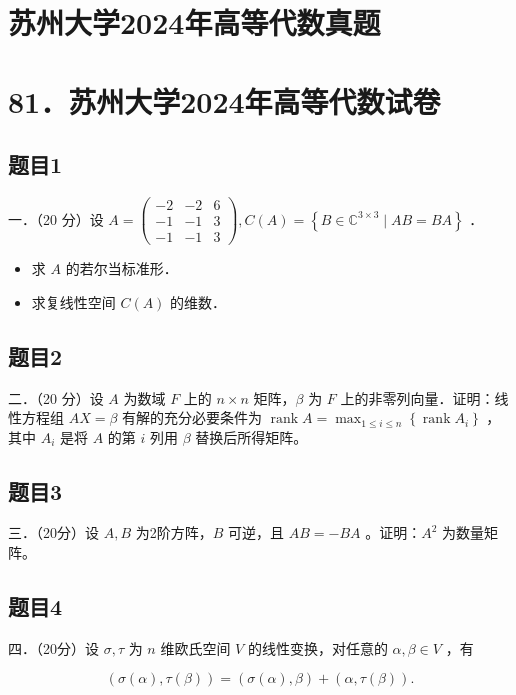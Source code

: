 \documentclass{article}
\begin{document}
\section*{苏州大学2024年高等代数真题}
\section*{81．苏州大学2024年高等代数试卷}

\subsection{题目1}
一．（20 分）设 \(A=\left(\begin{array}{lll}-2 & -2 & 6 \\ -1 & -1 & 3 \\ -1 & -1 & 3\end{array}\right), C(A)=\left\{B \in \mathbb{C}^{3 \times 3} \mid A B=B A\right\}\) ．

\begin{itemize}
  \item[（1）] 求 \(A\) 的若尔当标准形．
  \item[（2）] 求复线性空间 \(C(A)\) 的维数．
\end{itemize}

\subsection{题目2}
二．（20 分）设 \(A\) 为数域 \(F\) 上的 \(n \times n\) 矩阵，\(\beta\) 为 \(F\) 上的非零列向量．证明：线性方程组 \(A X=\beta\) 有解的充分必要条件为 \(\operatorname{rank} A=\max _{1 \leq i \leq n}\left\{\operatorname{rank} A_{i}\right\}\) ，其中 \(A_{i}\) 是将 \(A\) 的第 \(i\) 列用 \(\beta\) 替换后所得矩阵。

\subsection{题目3}
三．（20分）设 \(A, B\) 为2阶方阵，\(B\) 可逆，且 \(A B=-B A\) 。证明：\(A^{2}\) 为数量矩阵。

\subsection{题目4}
四．（20分）设 \(\sigma, \tau\) 为 \(n\) 维欧氏空间 \(V\) 的线性变换，对任意的 \(\alpha, \beta \in V\) ，有

\[
(\sigma(\alpha), \tau(\beta))=(\sigma(\alpha), \beta)+(\alpha, \tau(\beta)) .
\]
\end{document}

